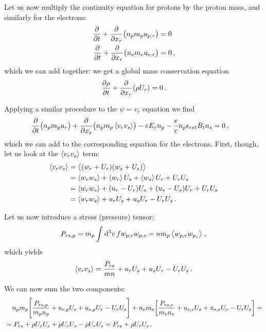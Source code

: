 \documentclass[main.tex]{subfiles}
\begin{document}
Let us now multiply the continuity equation for protons by the proton mass, and similarly for the electrons: 
%
\begin{align}
\pdv{}{t} (n_p m_p) + \pdv{}{x_r} \qty( n_p m_p u_{p, r}) &= 0  \\
\pdv{}{t} (n_e m_e) + \pdv{}{x_r} \qty( n_e m_e u_{e, r}) &= 0 
\,,
\end{align}
%
which we can add together: we get a global mass conservation equation
%
\begin{align}
\pdv{\rho }{t} + \pdv{}{x_r} \qty(\rho U_r) = 0
\,.
\end{align}

Applying a similar procedure to the \(\psi = v_r\) equation we find 
%
\begin{align}
\pdv{}{t} \qty(n_p m_p u_r) + \pdv{}{x_s} \qty(n_p m_p \expval{v_r v_s}) - e E_r n_p - \frac{e}{c} n_p \epsilon_{rst} B_t n_s &= 0
\,,
\end{align}
%
which we can add to the corresponding equation for the electrons. 
First, though, let us look at the \(\expval{v_r v_s}\) term: 
%
\begin{align}
\expval{v_r v_s} 
&= \expval{(w_r + U_r) (w_s + U_s)}   \\
&= \expval{w_r w_s} + \expval{w_r} U_s + \expval{w_s} U_r + U_r U_s  \\
&=  \expval{w_r w_s} + (u_r - U_r) U_s + (u_s - U_s) U_r + U_r U_s   \\
&= \expval{w_r w_s} + u_r U_s + u_s U_r - U_r U_s
\,.
\end{align}

Let us now introduce a stress (pressure) tensor:
%
\begin{align}
P_{rs, p} = m_p \int \dd[3]{v} f w_{p, r} w_{p, s} = n m_p \expval{w_{p, r} w_{p_s}}
\,,
\end{align}
%
which yields 
%
\begin{align}
\expval{v_r v_s} = \frac{P_{rs}}{mn} + u_r U_s + u_s U_r - U_r U_s
\,.
\end{align}

We can now sum the two components: 
%
\begin{align}
\begin{split}
&\phantom{=}\ 
n_p m_p \qty[\frac{P_{rs, p}}{m_p n_p} + u_{r, p} U_s + u_{s, p} U_r - U_r U_s] + 
n_e m_e \qty[\frac{P_{rs, e}}{m_e n_e} + u_{r, e} U_s + u_{s, e} U_r - U_r U_s] =\\
&= P_{rs} + \rho U_r U_s + \rho U_r U_s - \rho U_r U_s 
= P_{rs} + \rho U_r U_s  
\,.
\end{split}
\end{align}
\end{document}
